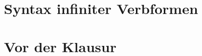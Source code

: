 \documentclass[handout,aspectratio=1610,dvipsnames]{beamer}
\begin{document}
  \section[Infinitivsyntax]{Syntax infiniter Verbformen}
  \let\woopsi\section\let\section\subsection\let\subsection\subsubsection
  
  \let\subsection\section\let\section\woopsi

  \section{Vor der Klausur}
\end{document}
